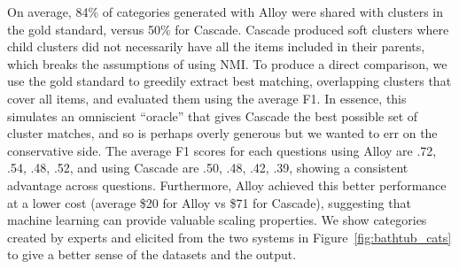 On average, 84\% of categories generated with Alloy were shared with clusters
in the gold standard, versus 50\% for Cascade.  Cascade produced soft
clusters where child clusters did not necessarily have all the items included in
their parents, which breaks the assumptions of using NMI. To produce
a direct comparison, we use the gold standard to greedily extract best
matching, overlapping clusters that cover all items, and evaluated them using
the average F1. In essence, this simulates an omniscient ``oracle'' that gives
Cascade the best possible set of cluster matches, and so is perhaps overly
generous but we wanted to err on the conservative side. The average F1 scores
for each questions using Alloy are .72, .54, .48, .52, and using Cascade are
.50, .48, .42, .39, showing a consistent advantage across questions.
Furthermore, Alloy achieved this better performance at a
lower cost (average \$20 for Alloy vs \$71 for Cascade),
suggesting that machine learning can provide valuable scaling properties.
We show categories created by experts and elicited from the two systems
in Figure~\ref{fig:bathtub_cats} to give a better sense of the datasets and the output.

